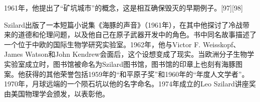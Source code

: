 1961年，他提出了“矿坑城市”的概念，这是相互确保毁灭的早期例子。[97][98]

Szilard出版了一本短篇小说集《海豚的声音》（1961年），在其中他探讨了冷战带来的道德和伦理问题，以及他自己在原子武器开发中的角色。书中同名故事描述了一个位于中欧的国际生物学研究实验室。1962年，他与Victor F. Weisskopf、James Watson和John Kendrew会面后，这个设想变成了现实。当欧洲分子生物学实验室成立时，图书馆被命名为Szilard图书馆，图书馆的印章上也刻有海豚图案。他获得的其他荣誉包括1959年的“和平原子奖”和1960年的“年度人文学者”。1970年，月球远端的一个陨石坑以他的名字命名。1974年成立的Leo Szilard讲座奖由美国物理学会颁发，以表彰他。

